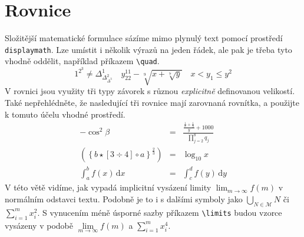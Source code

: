\documentclass[twocolumn,a4paper,11pt]{article}
\theoremstyle{definition}
\theoremstyle{plain}
\begin{document}
\section{Rovnice}
\label{sec:rovnice}
Složitější matematické formulace sázíme mimo plynulý text pomocí prostředí \verb|displaymath|. Lze umístit i několik výrazů na jeden řádek, ale pak je třeba tyto vhodně oddělit, například příkazem \verb|\quad|.
\[1^{2^3}\neq \Delta^1_{\Delta^2_{\Delta^3}}\quad y^{11}_{22}-\sqrt[9]{x+\sqrt[7]{y}}\quad x < y_1\leq y^2\]
V rovnici jsou využity tři typy závorek s různou \emph{explicitně} definovanou velikostí. Také nepřehlédněte, že nasledující tři rovnice mají zarovnaná rovnítka, a použijte k tomuto účelu vhodné prostředí.
\begin{eqnarray}
    \label{eq:1}
    -\cos^2\beta & = & \frac{\frac{\frac{1}{x}+\frac{1}{3}}{y}+1000}{\prod\limits_{j=2}^8 q_j} \\
    \label{eq:2}
    \left(\left\{b\star[3 \div 4]\circ a\right\}^\frac{2}{3}\right) & = & \log_{10} x \\
    \label{eq:3}
    \int_a^b f(x)\,\mathrm{d}x & = & \int_c^d f(y)\,\mathrm{d}y
\end{eqnarray}
V této větě vidíme, jak vypadá implicitní vysázení limity $\lim_{m \to \infty} f(m)$ v normálním odstavci textu. Podobně je to i s dalšími symboly jako $\bigcup_{N\in\mathcal{M}} N$ či $\sum^{m}_{i=1} x^2_i$.
S vynucením méně úsporné sazby příkazem \verb|\limits| budou vzorce vysázeny v podobě $\lim\limits_{m\to \infty} f(m)$ a $\sum\limits_{i=1}^{m} x^{4}_{i}$.
\end{document}
